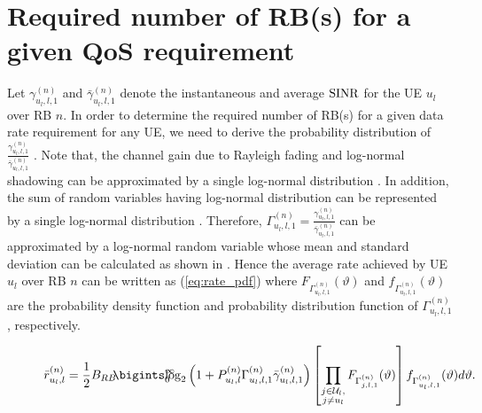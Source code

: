 \documentclass[twocolumn,10pt]{IEEEtran}
\begin{document}
\appendices
{} 

\section{Required number of RB(s) for a given QoS requirement} 
\label{app:num_rb}


Let $\gamma_{u_l,l, 1}^{(n)}$ and $\bar{\gamma}_{u_l,l, 1}^{(n)}$ denote the instantaneous and average ${\rm SINR}$ for the UE $u_l$ over RB $n$.  In order to determine the required number of RB(s) for a given data rate requirement for any UE, we need to derive the probability distribution of $\frac{\gamma_{u_l,l, 1}^{(n)}}{\bar{\gamma}_{u_l,l, 1}^{(n)}}$  \cite{lee_qos}. Note that, the channel gain due to Rayleigh fading and log-normal shadowing can be approximated by a single log-normal distribution \cite{pdf_lognormal-1, pdf_lognormal}. In addition, the sum of random variables having log-normal distribution can be represented by a single log-normal distribution \cite{sum_lognormal}. Therefore, $\Gamma_{u_l,l, 1}^{(n)} = \frac{\gamma_{u_l,l, 1}^{(n)}}{\bar{\gamma}_{u_l,l, 1}^{(n)}}$ can be approximated by a log-normal random
variable whose mean and standard deviation can be calculated
as shown in \cite{pdf_lognormal}. Hence the average rate achieved by UE  $u_l$ over RB $n$ can be written as (\ref{eq:rate_pdf}) where $F_{\Gamma_{u_l,l, 1}^{(n)}}(\vartheta)$ and $f_{\Gamma_{u_l,l, 1}^{(n)}}(\vartheta) $ are the probability density function and probability distribution function of $\Gamma_{u_l,l, 1}^{(n)}$, respectively.



\begin{figure*}[!t]
\normalsize

\begin{equation} \label{eq:rate_pdf}
\bar{r}_{u_l, l}^{(n)} = \frac{1}{2} B_{RB} \hspace{-0.3em} \bigints_{0}^{\infty} \hspace{-1em}\log_2 \left( 1 +  P_{u_l, l}^{(n)} \Gamma_{u_l,l, 1}^{(n)} \bar{\gamma}_{u_l,l, 1}^{(n)}\right) \left[ \prod_{\substack{j \in \mathcal{U}_l, \\ j \neq u_l}}  F_{\Gamma_{j,l, 1}^{(n)}}(\vartheta) \right] f_{\Gamma_{u_l,l, 1}^{(n)}}(\vartheta) d\vartheta.
\end{equation}


\hrulefill
\vspace*{4pt}
\end{figure*}
\end{document}
